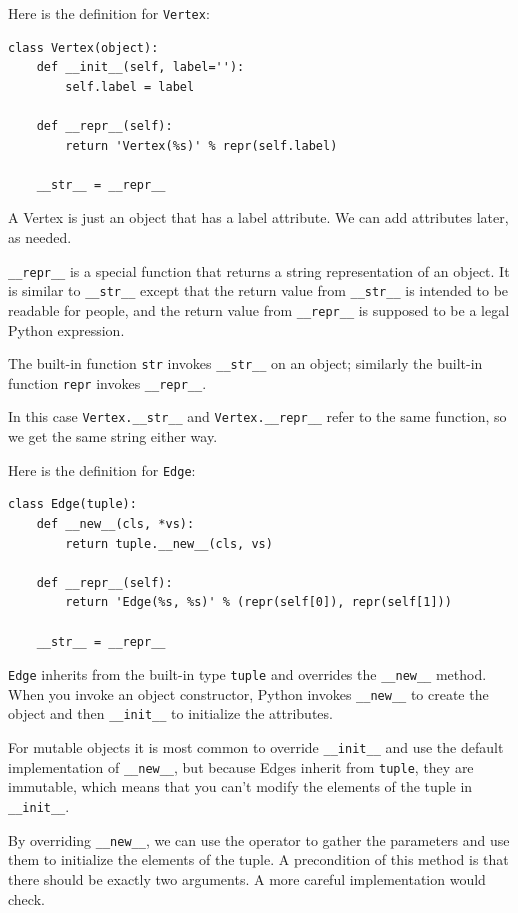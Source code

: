 \documentclass[10pt]{book}
\begin{document}
Here is the definition for {\tt Vertex}:
%
\begin{verbatim}
class Vertex(object):
    def __init__(self, label=''):
        self.label = label

    def __repr__(self):
        return 'Vertex(%s)' % repr(self.label)

    __str__ = __repr__
\end{verbatim}
%
A Vertex is just an object that has a label attribute.  We can
add attributes later, as needed.

\verb"__repr__" is a special function that returns a string
representation of an object.  It is similar to \verb"__str__" except
that the return value from \verb"__str__" is intended to be readable
for people, and the return value from \verb"__repr__" is supposed to
be a legal Python expression.

The built-in function {\tt str} invokes \verb"__str__" on
an object; similarly the built-in function {\tt repr} invokes
\verb"__repr__".

In this case \verb"Vertex.__str__" and \verb"Vertex.__repr__" refer to
the same function, so we get the same string either way.

Here is the definition for {\tt Edge}:
%
\begin{verbatim}
class Edge(tuple):
    def __new__(cls, *vs):
        return tuple.__new__(cls, vs)

    def __repr__(self):
        return 'Edge(%s, %s)' % (repr(self[0]), repr(self[1]))

    __str__ = __repr__
\end{verbatim}
%
{\tt Edge} inherits from the built-in type {\tt tuple}
and overrides the \verb"__new__" method.  When you invoke
an object constructor, Python invokes \verb"__new__" to create
the object and then \verb"__init__" to initialize the attributes.

For mutable objects it is most common to override
\verb"__init__" and use the default implementation of
\verb"__new__", but because Edges inherit from {\tt tuple}, they
are immutable, which means that you can't modify the elements
of the tuple in \verb"__init__".

By overriding \verb"__new__", we can use the {\tt *} operator to
gather the parameters and use them to initialize the elements of
the tuple.  A precondition of this method is that there should
be exactly two arguments.  A more careful implementation would
check.
\end{document}
